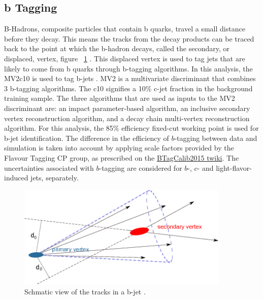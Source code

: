 \subsection{b Tagging}\label{ssec:btag}
B-Hadrons, composite particles that contain b quarks, travel a small distance before they decay. This means the tracks from the decay products can be traced back to the point at which the b-hadron decays, called the secondary, or displaced, vertex, figure ~\ref{fig:bjets} . This displaced vertex is used to tag jets that are likely to come from b quarks through b-tagging algorithms.\newline
\indent In this analysis, the MV2c10 is used to tag b-jets \cite{ATL-PHYS-PUB-2016-012}. MV2 is a multivariate discriminant that combines 3 b-tagging algorithms. The c10 signifies a 10\% c-jet fraction in the background training sample. The three algorithms that are used as inputs to the MV2 discriminant are: an impact parameter-based algorithm, an inclusive secondary vertex reconstruction algorithm, and a decay chain multi-vertex reconstruction algorithm. For this analysis, the 85\% efficiency fixed-cut working point is used for b-jet identification.\newline
\indent The difference in the efficiency of $b$-tagging between data and simulation 
is taken into account by applying scale factors provided by the Flavour Tagging CP group, 
as prescribed on the \href{https://twiki.cern.ch/twiki/bin/view/AtlasProtected/BTagCalib2015}{BTagCalib2015 twiki}. 
The uncertainties associated with $b$-tagging are considered for $b$-, $c$- and light-flavor-induced jets, separately. 

\begin{figure}[h]
\begin{center}
\includegraphics*[width=0.90\textwidth] {figures/bjet}
\caption[Schmatic view of the tracks in a b-jet]{Schmatic view of the tracks in a b-jet \cite{HanssonAdrian:1397942}.}
\label{fig:bjets}
\end{center}
\end{figure}

